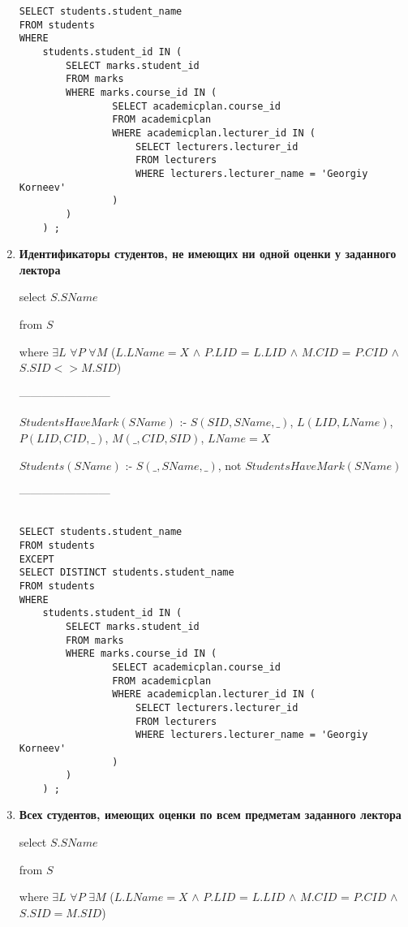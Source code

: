 \documentclass[12pt]{article}
\begin{document}
\begin{enumerate}
\begin{verbatim}
SELECT students.student_name
FROM students 
WHERE 
	students.student_id IN (
		SELECT marks.student_id
		FROM marks
		WHERE marks.course_id IN (
				SELECT academicplan.course_id 
				FROM academicplan
				WHERE academicplan.lecturer_id IN (
					SELECT lecturers.lecturer_id
					FROM lecturers
					WHERE lecturers.lecturer_name = 'Georgiy Korneev'
				)			
		)
	) ;

		\end{verbatim}

                                                                                            
    \item \textbf{Идентификаторы студентов, не имеющих ни одной оценки у заданного лектора}

            	select   $S.SName$  
     		
     		from   $S$   
     		
     		where   $\exists L$ $\forall P$ $\forall M$ ($L.LName = X$ $\wedge$ $P.LID$ = $L.LID$  $\wedge$ $M.CID$ = $P.CID$ $\wedge$ $S.SID <> M.SID$)    

		------------------------

     		$StudentsHaveMark(SName)$ :- $S(SID, SName, \_)$, $L(LID, LName)$, $P(LID, CID, \_)$, $M(\_, CID, SID)$, $LName = X$     		     		

		$Students(SName)$ :- $S(\_, SName, \_)$, not $StudentsHaveMark(SName)$

		------------------------     		

		\begin{verbatim}

SELECT students.student_name
FROM students 
EXCEPT 
SELECT DISTINCT students.student_name
FROM students 
WHERE 
	students.student_id IN (
		SELECT marks.student_id
		FROM marks
		WHERE marks.course_id IN (
				SELECT academicplan.course_id 
				FROM academicplan
				WHERE academicplan.lecturer_id IN (
					SELECT lecturers.lecturer_id
					FROM lecturers
					WHERE lecturers.lecturer_name = 'Georgiy Korneev'
				)			
		)
	) ;

		\end{verbatim}
    
        
    \item \textbf{Всех студентов, имеющих оценки по всем предметам заданного лектора}
    
    		select   $S.SName$  
     		
     		from   $S$   
     		
     		where   $\exists L$ $\forall P$ $\exists M$ ($L.LName = X$ $\wedge$ $P.LID$ = $L.LID$  $\wedge$ $M.CID$ = $P.CID$ $\wedge$ $S.SID = M.SID$)    
     		

\end{enumerate}
\end{document}
